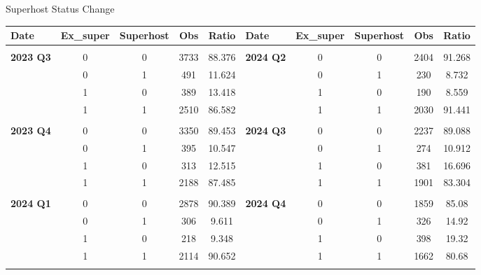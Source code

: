 \begin{table}[]
 \TABLE 
 {Superhost Status Change \label{Sup_change}} {\begin{tabular}{lcccc|lcccc}
\hline
 Date &Ex\_super &Superhost & Obs & Ratio & Date & Ex\_super & Superhost & Obs & Ratio \\ \hline
 \\ 
\textbf{2023 Q3} & 0 & 0 & 3733 & 88.376 & \multirow{1}{*}{\textbf{2024 Q2}} & 0 & 0 & 2404 & 91.268 \\ 
 & 0 & 1 & 491 & 11.624 &  & 0 & 1 & 230 & 8.732 \\ 
 & 1 & 0 & 389 & 13.418 &  & 1 & 0 & 190 & 8.559 \\ 
 & 1 & 1 & 2510 & 86.582 &  & 1 & 1 & 2030 & 91.441 \\ 
 \\ 
\textbf{2023 Q4} & 0 & 0 & 3350 & 89.453 & \multirow{1}{*}{\textbf{2024 Q3}} & 0 & 0 & 2237 & 89.088 \\ 
 & 0 & 1 & 395 & 10.547 &  & 0 & 1 & 274 & 10.912 \\ 
 & 1 & 0 & 313 & 12.515 &  & 1 & 0 & 381 & 16.696 \\ 
 & 1 & 1 & 2188 & 87.485 &  & 1 & 1 & 1901 & 83.304 \\ 
 \\ 
\textbf{2024 Q1} & 0 & 0 & 2878 & 90.389 & \multirow{1}{*}{\textbf{2024 Q4}} & 0 & 0 & 1859 & 85.08 \\ 
 & 0 & 1 & 306 & 9.611 &  & 0 & 1 & 326 & 14.92 \\ 
 & 1 & 0 & 218 & 9.348 &  & 1 & 0 & 398 & 19.32 \\ 
 & 1 & 1 & 2114 & 90.652 &  & 1 & 1 & 1662 & 80.68 \\ 
 \\ 
\hline 
 \end{tabular}}{\textit{}}
\end{table}

